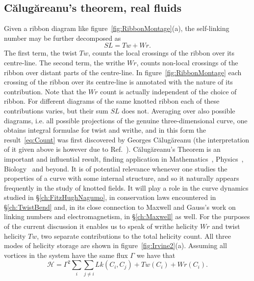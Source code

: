 \subsection{C\u{a}lug\u{a}reanu's theorem, real fluids}
Given a ribbon diagram like figure~\ref{fig:RibbonMontage}(a), the self-linking number may be further decomposed as
\begin{equation}
    SL = Tw + Wr.
    \label{eq:Count}
\end{equation}
The first term, the twist $Tw$, counts the local crossings of the ribbon over its centre-line. The second term, the writhe $Wr$, counts non-local crossings of the ribbon over distant parts of the centre-line. In figure~\ref{fig:RibbonMontage} each crossing of the ribbon over its centre-line is annotated with the nature of its contribution. Note that the $Wr$ count is actually independent of the choice of ribbon. For different diagrams of the same knotted ribbon each of these contributions varies, but their sum $SL$ does not. Averaging over also possible diagrams, i.e. all possible projections of the genuine three-dimensional curve, one obtains integral formulae for twist and writhe, and in this form the result~\eqref{eq:Count} was first discovered by Georges C\u{a}lug\u{a}reanu \citep{Calugareanu1959,Calugareanu1961} (the interpretation of it given above is however due to Ref.~\citep{Dennis2005}). C\u{a}lug\u{a}reanu's Theorem is an important and influential result, finding application in Mathematics~\citep{White1969,Adams2004,Aldinger1995}, Physics~\citep{Moffat1992, Goldstein1995, Berger2006}, Biology~\citep{Fuller1978, Winfree1983, Sumners1995} and beyond. It is of potential relevance whenever one studies the properties of a curve with some internal structure, and so it naturally appears frequently in the study of knotted fields. It will play a role in the curve dynamics studied in \S\ref{ch:FitzHughNagumo}, in conservation laws encountered in \S\ref{ch:TwistBend} and, in its close connection to Maxwell and Gauss's work on linking numbers and electromagnetism, in \S\ref{ch:Maxwell} as well. For the purposes of the current discussion it enables us to speak of writhe helicity $Wr$ and twist helicity $Tw$, two separate contributions to the total helicity count. All three modes of helicity storage are shown in figure~\ref{fig:Irvine2}(a). Assuming all vortices in the system have the same flux $\Gamma$ we have that
\begin{equation}
 \mathcal{H} = \Gamma^2\sum_i \sum_{j \neq i} Lk(C_i,C_j) + Tw(C_i) + Wr(C_i).\label{eq:twistpluswrithe} 
\end{equation}
